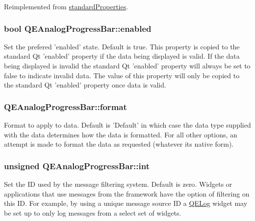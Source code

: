 Reimplemented from \hyperlink{classstandardProperties}{standardProperties}.

\hypertarget{classQEAnalogProgressBar_a0bfadd6048cf4d39c16110536b0d80cc}{
\subsubsection[{enabled}]{\setlength{\rightskip}{0pt plus 5cm}bool QEAnalogProgressBar::enabled}}
\label{classQEAnalogProgressBar_a0bfadd6048cf4d39c16110536b0d80cc}
Set the prefered 'enabled' state. Default is true. This property is copied to the standard Qt 'enabled' property if the data being displayed is valid. If the data being displayed is invalid the standard Qt 'enabled' property will always be set to false to indicate invalid data. The value of this property will only be copied to the standard Qt 'enabled' property once data is valid. \hypertarget{classQEAnalogProgressBar_a21bc4b7e9570ef6c39d4f100d102804c}{
\subsubsection[{format}]{ QEAnalogProgressBar::format}}
\label{classQEAnalogProgressBar_a21bc4b7e9570ef6c39d4f100d102804c}
Format to apply to data. Default is 'Default' in which case the data type supplied with the data determines how the data is formatted. For all other options, an attempt is made to format the data as requested (whatever its native form). \hypertarget{classQEAnalogProgressBar_abf621cec891bfd1682706c1d69b230d3}{
\subsubsection[{int}]{\setlength{\rightskip}{0pt plus 5cm}unsigned QEAnalogProgressBar::int}}
\label{classQEAnalogProgressBar_abf621cec891bfd1682706c1d69b230d3}
Set the ID used by the message filtering system. Default is zero. Widgets or applications that use messages from the framework have the option of filtering on this ID. For example, by using a unique message source ID a \hyperlink{classQELog}{QELog} widget may be set up to only log messages from a select set of widgets.

